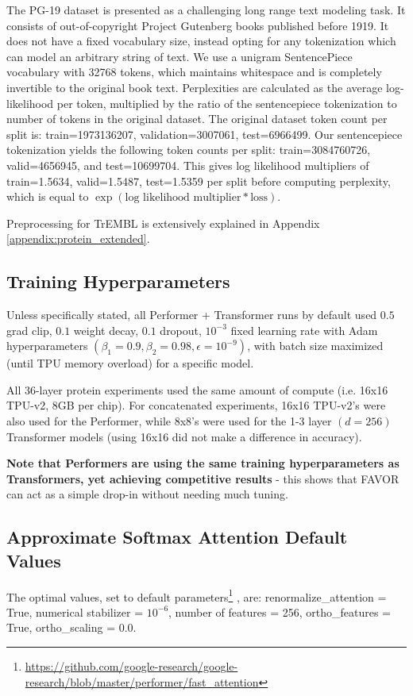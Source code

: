 The PG-19 dataset \citep{compr} is presented as a challenging long range text modeling task. It consists of out-of-copyright Project Gutenberg books published before 1919. It does not have a fixed vocabulary size, instead opting for any tokenization which can model an arbitrary string of text. We use a unigram SentencePiece vocabulary \citep{sentencepiece} with 32768 tokens, which maintains whitespace and is completely invertible to the original book text. Perplexities are calculated as the average log-likelihood per token, multiplied by the ratio of the sentencepiece tokenization to number of tokens in the original dataset. The original dataset token count per split is: train=1973136207, validation=3007061, test=6966499. Our sentencepiece tokenization yields the following token counts per split: train=3084760726, valid=4656945, and test=10699704. This gives log likelihood multipliers of train=1.5634, valid=1.5487, test=1.5359 per split before computing perplexity, which is equal to $\exp(\text{log likelihood multiplier} * \text{loss})$.

Preprocessing for TrEMBL is extensively explained in Appendix \ref{appendix:protein_extended}.

\subsection{Training Hyperparameters} 
Unless specifically stated, all Performer + Transformer runs by default used $0.5$ grad clip, $0.1$ weight decay, $0.1$ dropout, $10^{-3}$ fixed learning rate with Adam hyperparameters $(\beta_{1} = 0.9, \beta_{2} = 0.98, \epsilon = 10^{-9})$, with batch size maximized (until TPU memory overload) for a specific model. 

All 36-layer protein experiments used the same amount of compute (i.e. 16x16 TPU-v2, 8GB per chip). For concatenated experiments, 16x16 TPU-v2's were also used for the Performer, while 8x8's were used for the 1-3 layer $(d = 256)$ Transformer models (using 16x16 did not make a difference in accuracy).

\textbf{Note that Performers are using the same training hyperparameters as Transformers, yet achieving competitive results} - this shows that FAVOR can act as a simple drop-in without needing much tuning.

\subsection{Approximate Softmax Attention Default Values} The optimal values, set to default parameters\footnote{\url{https://github.com/google-research/google-research/blob/master/performer/fast_attention}}
, are: renormalize\_attention = True, numerical stabilizer = $10^{-6}$, number of features = 256, ortho\_features = True, ortho\_scaling = 0.0.

